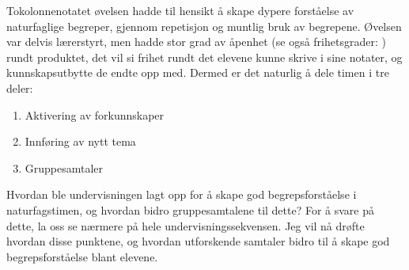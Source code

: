 \documentclass[main.tex]{subfiles}
\begin{document}
Tokolonnenotatet øvelsen hadde til hensikt å skape dypere forståelse av naturfaglige begreper, 
gjennom repetisjon og muntlig bruk av begrepene. Øvelsen var delvis lærerstyrt, 
men hadde stor grad av åpenhet (se også frihetsgrader: ) rundt produktet, det vil
si frihet rundt det elevene kunne skrive i sine notater, og kunnskapsutbytte de endte opp med.
\newline
\newline
Dermed er det naturlig å dele timen i tre deler:
\begin{enumerate}
\item Aktivering av forkunnskaper  
\item Innføring av nytt tema
\item Gruppesamtaler
\end{enumerate}
Hvordan ble undervisningen lagt opp for å skape god begrepsforståelse i naturfagstimen, 
og hvordan bidro gruppesamtalene til dette? For å svare på dette, la oss se nærmere på hele 
undervisningssekvensen. Jeg vil nå drøfte hvordan disse punktene, og hvordan utforskende
samtaler bidro til å skape god begrepsforståelse blant elevene.
\end{document}
